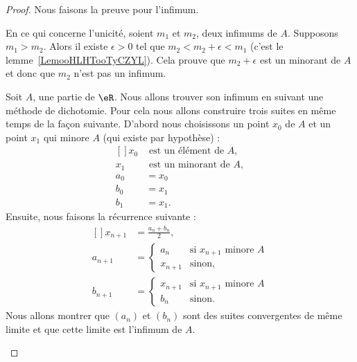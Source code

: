 \begin{proof}
	Nous faisons la preuve pour l'infimum.

	\begin{subproof}
		\spitem[Unicité]

		En ce qui concerne l'unicité, soient \( m_1\) et \( m_2\), deux infimums de \( A\). Supposons \( m_1>m_2\). Alors il existe \( \epsilon>0\) tel que \( m_2<m_2+\epsilon<m_1\) (c'est le lemme~\ref{LemooHLHTooTyCZYL}). Cela prouve que \( m_2+\epsilon\) est un minorant de \( A\) et donc que \( m_2\) n'est pas un infimum.

		\spitem[Existence]

		Soit \( A\), une partie de \( \eR\). Nous allons trouver son infimum en suivant une méthode de dichotomie. Pour cela nous allons construire trois suites en même temps de la façon suivante. D'abord nous choisissons un point \( x_0\) de \( A\) et un point \( x_1\) qui minore \( A\) (qui existe par hypothèse) :
		\begin{equation}
			\begin{aligned}[]
				x_0 & \text{ est un élément de }A,  \\
				x_1 & \text{ est un minorant de }A, \\
				a_0 & =x_0                          \\
				b_0 & =x_1                          \\
				b_1 & =x_1.
			\end{aligned}
		\end{equation}
		Ensuite, nous faisons la récurrence suivante :
		\begin{equation}
			\begin{aligned}[]
				x_{n+1} & =\frac{ a_n+b_n }{2},                          \\
				a_{n+1} & =\begin{cases}
					           a_{n}   & \text{si }x_{n+1} \text{ minore } A \\
					           x_{n+1} & \text{sinon},
				           \end{cases} \\
				b_{n+1} & =\begin{cases}
					           x_{n+1} & \text{si }x_{n+1} \text{ minore } A \\
					           b_n     & \text{sinon}.
				           \end{cases}
			\end{aligned}
		\end{equation}
		Nous allons montrer que \( (a_n)\) et \( (b_n)\) sont des suites convergentes de même limite et que cette limite est l'infimum de \( A\).


\end{subproof}
\end{proof}
